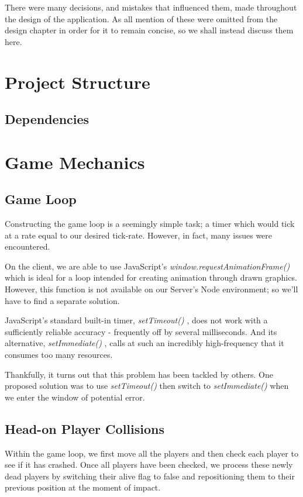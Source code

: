 \documentclass{standalone}
\begin{document}
	There were many decisions, and mistakes that influenced them, made throughout the design of the application. As all mention of these were omitted from the design chapter  in order for it to remain concise, so we shall instead discuss them here.

	\section{Project Structure}
		\subsection{Dependencies}

	\section{Game Mechanics}
		\subsection{Game Loop}
			Constructing the game loop is a seemingly simple task; a timer which would tick at a rate equal to our desired tick-rate. However, in fact, many issues were encountered.

			On the client, we are able to use JavaScript's \emph{window.requestAnimationFrame()} \parencite{JsRequestAnimationFrame} which is ideal for a loop intended for creating animation through drawn graphics. However, this function is not available on our Server's Node environment; so we'll have to find a separate solution.

			JavaScript's standard built-in timer, \emph{setTimeout()} \parencite{JsSetTimeout}, does not work with a sufficiently reliable accuracy - frequently off by several milliseconds. And its alternative, \emph{setImmediate()} \parencite{JsSetImmediate}, calls at such an incredibly high-frequency that it consumes too many resources.

			Thankfully, it turns out that this problem has been tackled by others. One proposed solution \parencite{JsGameLoop} was to use \emph{setTimeout()} then switch to \emph{setImmediate()} when we enter the window of potential error.

		\subsection{Head-on Player Collisions}
			Within the game loop, we first move all the players and then check each player to see if it has crashed. Once all players have been checked, we process these newly dead players by switching their alive flag to false and repositioning them to their previous position at the moment of impact.
\end{document}

